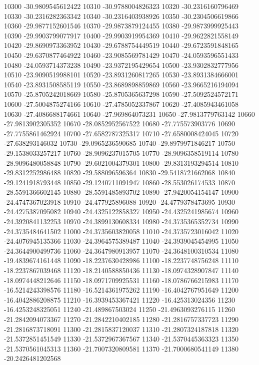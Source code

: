 {10300 -30.9809545612422
10310 -30.9788004826323
10320 -30.2316160796469
10330 -30.2316282363342
10340 -30.2316403938926
10350 -30.2304506619866
10360 -29.9877152601546
10370 -29.9873879124455
10380 -29.9873999925443
10390 -29.9903799077917
10400 -29.9903919954369
10410 -29.9622821558149
10420 -29.8690973363952
10430 -29.6788754449519
10440 -29.6723591848165
10450 -29.6370877464922
10460 -23.9085569781429
10470 -24.0593596551433
10480 -24.0593714373238
10490 -23.9372195429654
10500 -23.9302832777956
10510 -23.9090519988101
10520 -23.8931260817265
10530 -23.8931384666001
10540 -23.8931508585119
10550 -23.8689898859869
10560 -23.9665216194094
10570 -25.8705242018669
10580 -25.8705365637298
10590 -27.5092524572171
10600 -27.5004875274166
10610 -27.4785052337867
10620 -27.4085943461058
10630 -27.4086688174661
10640 -27.969864073231
10650 -27.9813779763142
10660 -27.9813902305352
10670 -28.0852952567522
10680 -27.775573903776
10690 -27.7755861462924
10700 -27.6582787325317
10710 -27.6580008424045
10720 -27.638293146032
10730 -29.0965236590685
10740 -29.8979971846217
10750 -29.1538033257217
10760 -28.9096237015705
10770 -28.9096358519114
10780 -28.9096480058848
10790 -29.6021004379301
10800 -29.8313193294514
10810 -29.8312252986488
10820 -29.588096596364
10830 -29.5418721662068
10840 -29.1241918793448
10850 -29.1240711091947
10860 -28.553026174533
10870 -28.5591366602145
10880 -28.5591485893702
10890 -27.9420054154147
10900 -24.4747367023918
10910 -24.477925896088
10920 -24.4779378473695
10930 -24.4275387095082
10940 -24.4325122858327
10950 -24.4325241985674
10960 -24.3920841132253
10970 -24.3899130608334
10980 -24.3735365352734
10990 -24.3735484641502
11000 -24.3735603820058
11010 -24.3735723016042
11020 -24.4076945135366
11030 -24.3964575389487
11040 -24.3939045454995
11050 -24.3644900499736
11060 -24.3647980913957
11070 -24.3648100310534
11080 -19.4839674161448
11090 -18.2237630428986
11100 -18.2237748756248
11110 -18.2237867039468
11120 -18.2140588850436
11130 -18.0974328907847
11140 -18.0974448212646
11150 -18.0971709925531
11160 -18.0786766215983
11170 -16.5214243398576
11180 -16.5214361975262
11190 -16.4042767951649
11200 -16.4042886208875
11210 -16.3939453367421
11220 -16.425313024356
11230 -16.4253248325051
11240 -21.489867503024
11250 -21.4963093276115
11260 -21.2842094073367
11270 -21.2842210402185
11280 -21.2816757337723
11290 -21.2816873718091
11300 -21.2815837120037
11310 -21.2807324187818
11320 -21.5372851451549
11330 -21.5372967367567
11340 -21.5370445363323
11350 -21.5370561045313
11360 -21.7007320809581
11370 -21.7000680541149
11380 -20.2426481202568
}
